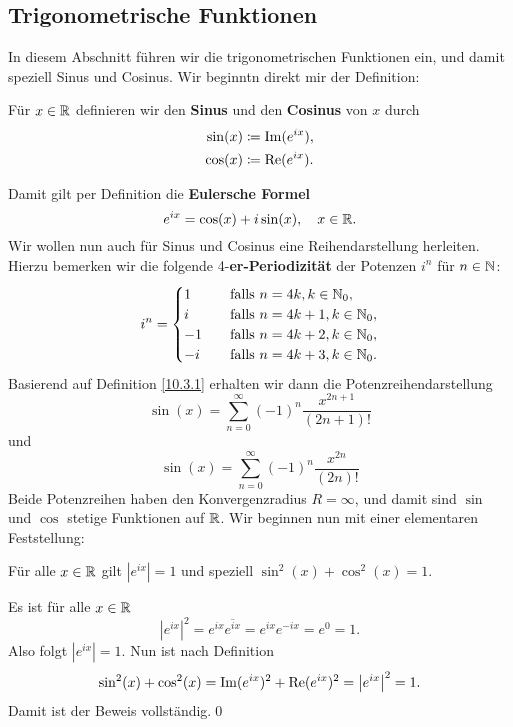 \subsection{Trigonometrische Funktionen}
In diesem Abschnitt führen wir die trigonometrischen Funktionen ein, und damit speziell Sinus und Cosinus. Wir beginntn direkt mir der Definition:
\begin{subdefinition}
	Für $ x \in \mathbb{R}  $ definieren wir den \textbf{Sinus} und den \textbf{Cosinus} von $ x $ durch
	\begin{align*}
		\sin (x) & \coloneqq \operatorname{Im}(e^{ix} ), \\
		\cos (x) & \coloneqq \operatorname{Re}(e^{ix} ). \\
	\end{align*}
\end{subdefinition}
Damit gilt per Definition die \textbf{Eulersche Formel}
\[
	e^{ix} = \cos (x) + i \sin (x), \quad x \in \mathbb{R} .
\]
Wir wollen nun auch für Sinus und Cosinus eine Reihendarstellung herleiten. Hierzu bemerken wir die folgende 4-\textbf{er-Periodizität} der Potenzen $ i^n $ für $ n \in \mathbb{N}  $:
\[
	i^n = \begin{cases}
		1 &\quad \text{falls } n = 4k, k \in \mathbb{N}_0,\\
		i &\quad \text{falls } n = 4k + 1, k \in \mathbb{N}_0,\\
		-1 &\quad \text{falls } n = 4k + 2, k \in \mathbb{N}_0,\\
		-i &\quad \text{falls } n = 4k + 3, k \in \mathbb{N}_0.\\
	\end{cases}
\]
Basierend auf Definition \ref{10.3.1} erhalten wir dann die Potenzreihendarstellung
\begin{equation}
	\label{eq:10.3.1}
	\sin (x) = \sum_{n=0}^{\infty} (-1)^n \frac{ x^{2n + 1} }{ (2n + 1)! } 
\end{equation}
und
\begin{equation}
	\label{eq:10.3.2}
	\sin (x) = \sum_{n=0}^{\infty} (-1)^n \frac{ x^{2n} }{ (2n)! } 
\end{equation}
Beide Potenzreihen haben den Konvergenzradius $ R = \infty $, und damit sind $ \sin  $ und $ \cos  $ stetige Funktionen auf $ \mathbb{R}  $. Wir beginnen nun mit einer elementaren Feststellung:
\begin{sublemma}
	Für alle $ x \in \mathbb{R}  $ gilt $ \left| e^{ix}  \right| = 1 $ und speziell $ \sin^2(x) + \cos^2(x) = 1 $.
\end{sublemma}
\begin{subproof*}
	Es ist für alle $ x \in \mathbb{R}  $ 
	\[
		\left| e^{ix}  \right|^2 = e^{ix} \overline{e^{ix} } = e^{ix} e^{-ix} = e^0 = 1.
	\]
	Also folgt $ \left| e^{ix}  \right| = 1 $. Nun ist nach Definition
	\[
		\sin^2(x) + \cos^2(x) = \operatorname{Im}(e^{ix})^2 + \operatorname{Re}(e^{ix} )^2 = \left| e^{ix}  \right|^2 = 1.
	\]
	Damit ist der Beweis vollständig.\qed
\end{subproof*}

